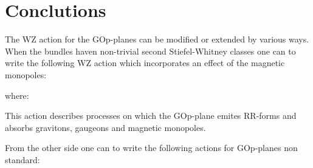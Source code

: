 \documentclass[a4paper,a4paper]{article}
\begin{document}
\section{Conclutions}

The WZ action for the GOp-planes can be modified or extended by various ways.
When the bundles haven non-trivial second Stiefel-Whitney classes one can to write the following WZ action which incorporates an effect of the magnetic monopoles:

\begin{center}
{  \coordHE{} }
\end{center}

where:

\begin{center}
{  \coordHE{} }
\end{center}

\begin{center}
{  \coordHE{} }
\end{center}

This action describes processes on which the GOp-plane emites RR-forms and absorbs gravitons, gaugeons and magnetic monopoles.

From the other side one can to write the following actions for GOp-planes non 
standard:

\begin{center}
{  \coordHE{} }
\end{center}
\end{document}
